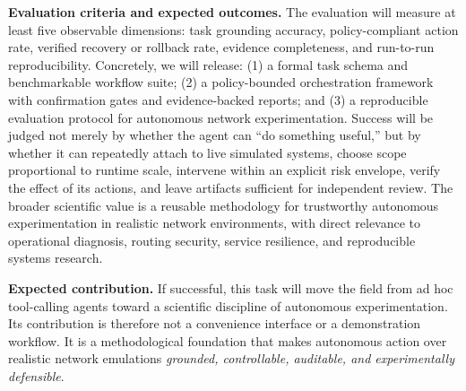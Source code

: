 \documentclass[10pt]{article}
\begin{document}
\textbf{Evaluation criteria and expected outcomes.} The evaluation will measure at least five observable dimensions: task grounding accuracy, policy-compliant action rate, verified recovery or rollback rate, evidence completeness, and run-to-run reproducibility. Concretely, we will release: (1) a formal task schema and benchmarkable workflow suite; (2) a policy-bounded orchestration framework with confirmation gates and evidence-backed reports; and (3) a reproducible evaluation protocol for autonomous network experimentation. Success will be judged not merely by whether the agent can ``do something useful,'' but by whether it can repeatedly attach to live simulated systems, choose scope proportional to runtime scale, intervene within an explicit risk envelope, verify the effect of its actions, and leave artifacts sufficient for independent review. The broader scientific value is a reusable methodology for trustworthy autonomous experimentation in realistic network environments, with direct relevance to operational diagnosis, routing security, service resilience, and reproducible systems research.

\textbf{Expected contribution.} If successful, this task will move the field from ad hoc tool-calling agents toward a scientific discipline of autonomous experimentation. Its contribution is therefore not a convenience interface or a demonstration workflow. It is a methodological foundation that makes autonomous action over realistic network emulations \emph{grounded, controllable, auditable, and experimentally defensible}.



\end{document}
